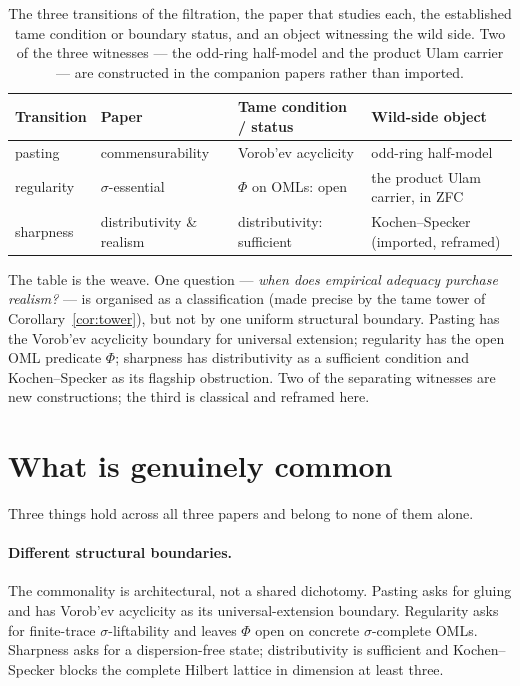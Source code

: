 \begin{table}[h]
\centering
\small
\begin{tabular}{@{}llll@{}}
\toprule
Transition & Paper & Tame condition / status & Wild-side object \\
\midrule
pasting
  & commensurability
  & Vorob'ev acyclicity
  & odd-ring half-model \\
regularity
  & $\sigma$-essential
  & $\Phi$ on OMLs: open
  & the product Ulam carrier, in ZFC \\
sharpness
  & distributivity \& realism
  & distributivity: sufficient
  & Kochen--Specker (imported, reframed) \\
\bottomrule
\end{tabular}
\caption{The three transitions of the filtration, the paper that studies each,
the established tame condition or boundary status, and an object witnessing
the wild side. Two of the three witnesses --- the odd-ring half-model and the
product Ulam carrier --- are constructed in the companion papers rather than
imported.}
\label{tab:map}
\end{table}

The table is the weave. One question --- \emph{when does empirical adequacy
purchase realism?} --- is organised as a classification (made precise by the
tame tower of Corollary~\ref{cor:tower}), but not by one uniform structural
boundary. Pasting has the Vorob'ev acyclicity boundary for universal extension;
regularity has the open OML predicate $\Phi$; sharpness has distributivity as a
sufficient condition and Kochen--Specker as its flagship obstruction. Two of
the separating witnesses are new constructions; the third is classical and
reframed here.


\section{What is genuinely common}\label{sec:common}

Three things hold across all three papers and belong to none of them alone.

\paragraph{Different structural boundaries.} The commonality is architectural,
not a shared dichotomy. Pasting asks for gluing and has Vorob'ev acyclicity as
its universal-extension boundary. Regularity asks for finite-trace
$\sigma$-liftability and leaves $\Phi$ open on concrete $\sigma$-complete OMLs.
Sharpness asks for a dispersion-free state; distributivity is sufficient and
Kochen--Specker blocks the complete Hilbert lattice in dimension at least three.

